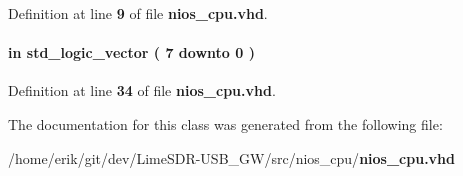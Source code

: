 Definition at line {\bf 9} of file {\bf nios\+\_\+cpu.\+vhd}.

\paragraph[{switch}]{ {\bfseries \textcolor{keywordflow}{in}\textcolor{vhdlchar}{ }} {\bfseries \textcolor{comment}{std\+\_\+logic\+\_\+vector}\textcolor{vhdlchar}{ }\textcolor{vhdlchar}{(}\textcolor{vhdlchar}{ }\textcolor{vhdlchar}{ } \textcolor{vhdldigit}{7} \textcolor{vhdlchar}{ }\textcolor{keywordflow}{downto}\textcolor{vhdlchar}{ }\textcolor{vhdlchar}{ } \textcolor{vhdldigit}{0} \textcolor{vhdlchar}{ }\textcolor{vhdlchar}{)}\textcolor{vhdlchar}{ }} \hspace{0.3cm}{\ttfamily [Port]}}\label{classnios__cpu_a67c6819297dac74e4ea1633161bf6c49}


Definition at line {\bf 34} of file {\bf nios\+\_\+cpu.\+vhd}.



The documentation for this class was generated from the following file\+:\begin{DoxyCompactItemize}
\item 
/home/erik/git/dev/\+Lime\+S\+D\+R-\/\+U\+S\+B\+\_\+\+G\+W/src/nios\+\_\+cpu/{\bf nios\+\_\+cpu.\+vhd}\end{DoxyCompactItemize}
